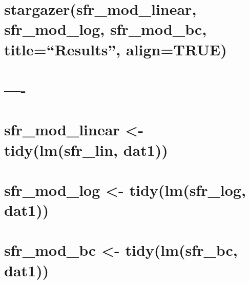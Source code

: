\documentclass[]{article}
\begin{document}
\hypertarget{stargazersfr_mod_linear-sfr_mod_log-sfr_mod_bc-titleresults-aligntrue}{%
\section{stargazer(sfr\_mod\_linear, sfr\_mod\_log, sfr\_mod\_bc,
title=``Results'',
align=TRUE)}\label{stargazersfr_mod_linear-sfr_mod_log-sfr_mod_bc-titleresults-aligntrue}}

\hypertarget{section}{%
\section{}\label{section}}

\hypertarget{section-1}{%
\section{}\label{section-1}}

\hypertarget{section-2}{%
\section{----}\label{section-2}}

\hypertarget{section-3}{%
\section{}\label{section-3}}

\hypertarget{section-4}{%
\section{}\label{section-4}}

\hypertarget{sfr_mod_linear---tidylmsfr_lin-dat1}{%
\section{sfr\_mod\_linear \textless{}- tidy(lm(sfr\_lin,
dat1))}\label{sfr_mod_linear---tidylmsfr_lin-dat1}}

\hypertarget{sfr_mod_log---tidylmsfr_log-dat1}{%
\section{sfr\_mod\_log \textless{}- tidy(lm(sfr\_log,
dat1))}\label{sfr_mod_log---tidylmsfr_log-dat1}}

\hypertarget{sfr_mod_bc---tidylmsfr_bc-dat1}{%
\section{sfr\_mod\_bc \textless{}- tidy(lm(sfr\_bc,
dat1))}\label{sfr_mod_bc---tidylmsfr_bc-dat1}}
\end{document}
